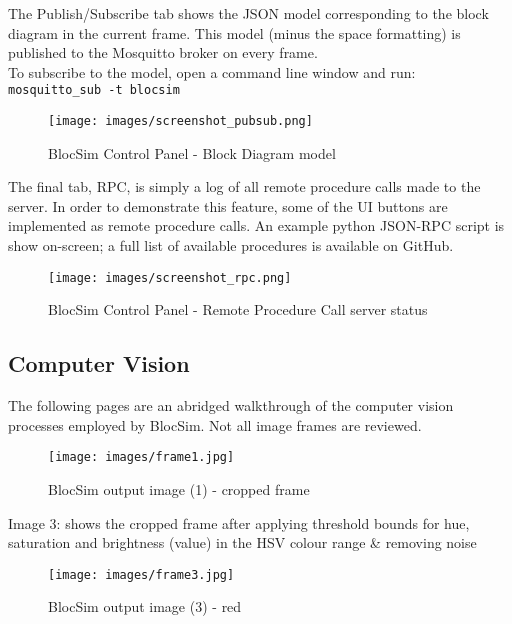 \newpage
The Publish/Subscribe tab shows the JSON model corresponding to the block diagram in the current frame. This model (minus the space formatting) is published to the Mosquitto broker on every frame.
\\

To subscribe to the model, open a command line window and run: \\ \texttt{mosquitto\_sub -t blocsim}

\begin{figure}[ht!]
\centering
\texttt{[image: images/screenshot\_pubsub.png]}
\caption{BlocSim Control Panel - Block Diagram model \cite{blocsim}}
\label{im:screenshot_pubsub}
\end{figure}

\newpage

The final tab, RPC, is simply a log of all remote procedure calls made to the server. In order to demonstrate this feature, some of the UI buttons are implemented as remote procedure calls. An example python JSON-RPC script is show on-screen; a full list of available procedures is available on GitHub.

\begin{figure}[ht!]
\centering
\texttt{[image: images/screenshot\_rpc.png]}
\caption{BlocSim Control Panel - Remote Procedure Call server status \cite{blocsim}}
\label{im:screenshot_rpc}
\end{figure}


\newpage

\subsection{Computer Vision}

The following pages are an abridged walkthrough of the computer vision processes employed by BlocSim. Not all image frames are reviewed.

\begin{figure}[ht!]
\centering
\texttt{[image: images/frame1.jpg]}
\caption{BlocSim output image (1) - cropped frame \cite{blocsim}}
\label{im:frame1}
\end{figure}

\newpage
Image 3: shows the cropped frame after applying threshold bounds for hue, saturation and brightness (value) in the HSV colour range \& removing noise

\begin{figure}[ht!]
\centering
\texttt{[image: images/frame3.jpg]}
\caption{BlocSim output image (3) - red \cite{blocsim}}
\label{im:frame3}
\end{figure}

